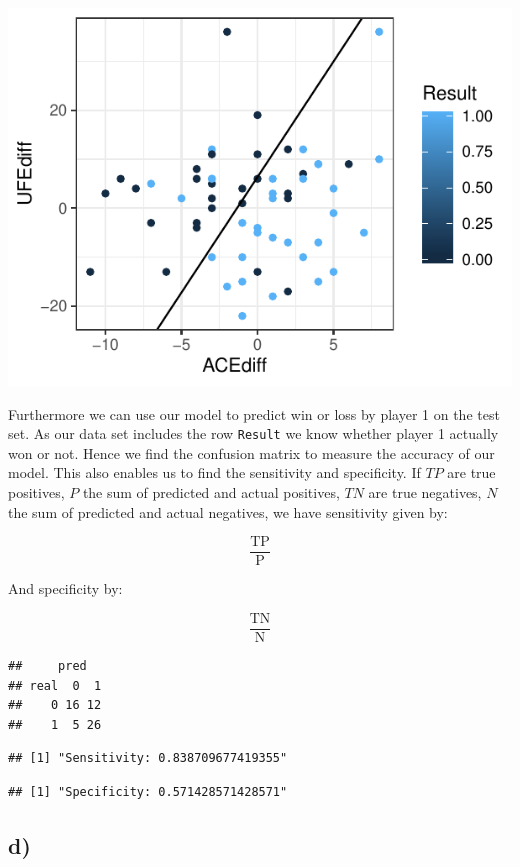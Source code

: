 \documentclass[
]{article}
\begin{document}
\includegraphics{Project_1_files/figure-latex/unnamed-chunk-12-1.pdf}

Furthermore we can use our model to predict win or loss by player 1 on
the test set. As our data set includes the row \texttt{Result} we know
whether player 1 actually won or not. Hence we find the confusion matrix
to measure the accuracy of our model. This also enables us to find the
sensitivity and specificity. If \(TP\) are true positives, \(P\) the sum
of predicted and actual positives, \(TN\) are true negatives, \(N\) the
sum of predicted and actual negatives, we have sensitivity given by:

\[
\frac{\text{TP}}{\text{P}}
\]

And specificity by:

\[
\frac{\text{TN}}{\text{N}}
\]

\begin{verbatim}
##     pred
## real  0  1
##    0 16 12
##    1  5 26
\end{verbatim}

\begin{verbatim}
## [1] "Sensitivity: 0.838709677419355"
\end{verbatim}

\begin{verbatim}
## [1] "Specificity: 0.571428571428571"
\end{verbatim}

\hypertarget{d-2}{%
\subsection{d)}\label{d-2}}
\end{document}
